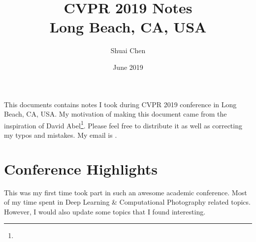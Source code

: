 \documentclass[11pt]{article}
\begin{document}
\title{CVPR 2019 Notes \\ \Large{Long Beach, CA, USA}}
\author{Shuai Chen \\ }
\date{June 2019}

\maketitle
\tableofcontents
\newpage

This documents contains notes I took during CVPR 2019 conference in Long Beach, CA, USA. My motivation of making this document came from the inspiration of David Abel\footnote{}. Please feel free to distribute it as well as correcting my typos and mistakes. My email is .

\section{Conference Highlights}
This was my first time took part in such an awesome academic conference. Most of my time spent in Deep Learning \& Computational Photography related topics. However, I would also update some topics that I found interesting.
\end{document}
